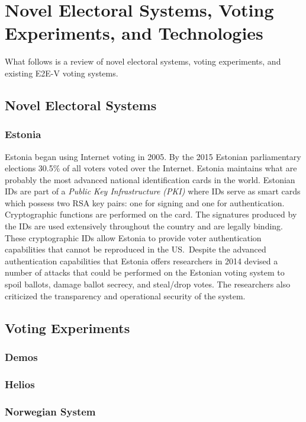 \section{Novel Electoral Systems, Voting Experiments, and Technologies}
What follows is a review of novel electoral systems, voting experiments, and
existing E2E-V voting systems.

\subsection{Novel Electoral Systems}

\subsubsection{Estonia}
Estonia began using Internet voting in 2005. By the 2015 Estonian parliamentary
elections 30.5\% of all voters voted over the Internet. Estonia maintains what
are probably the most advanced national identification cards in the world.
Estonian IDs are part of a \emph{Public Key Infrastructure (PKI)} where IDs
serve as smart cards which possess two RSA key pairs: one for signing and one
for authentication. Cryptographic functions are performed on the card. The
signatures produced by the IDs are used extensively throughout the country and
are legally binding. These cryptographic IDs allow Estonia to provide voter
authentication capabilities that cannot be reproduced in the US.\ Despite the
advanced authentication capabilities that Estonia offers researchers in 2014
devised a number of attacks that could be performed on the Estonian voting
system to spoil ballots, damage ballot secrecy, and steal/drop votes. The
researchers also criticized the transparency and operational security of the
system.

\subsection{Voting Experiments}

\subsubsection{Demos}

\subsubsection{Helios}

\subsubsection{Norwegian System}

